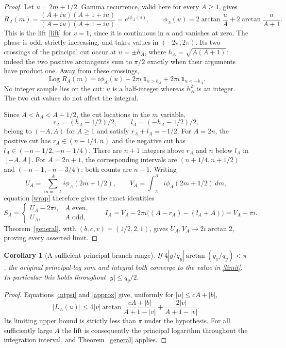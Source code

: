 \documentclass[10pt]{article}
\newtheorem{corollary}{Corollary}
\DeclareMathOperator{\Log}{Log}
\begin{document}
\begin{proof}
Let $u=2m+1/2$. Gamma recurrence, valid here for every $A\ge1$, gives
\begin{equation}\label{rational}
 R_A(m)=\frac{(A+iu)(A+1+iu)}{(A-iu)(A+1-iu)}
       =e^{i\phi_A(u)},\qquad
 \phi_A(u)=2\arctan\frac uA+2\arctan\frac u{A+1}.
\end{equation}
This is the lift \eqref{lift} for $v=1$, since it is continuous in
$u$ and vanishes at zero. The phase is odd, strictly increasing,
and takes values in $(-2\pi,2\pi)$. Its two crossings of the
principal cut occur at $u=\pm h_A$, where
$h_A=\sqrt{A(A+1)}$: indeed the two positive arctangents sum to
$\pi/2$ exactly when their arguments have product one.
Away from these crossings,
\begin{equation}\label{wrap}
 \Log R_A(m)=i\phi_A(u)-2\pi i\,\mathbf1_{u>h_A}
                               +2\pi i\,\mathbf1_{u<-h_A}.
\end{equation}
No integer sample lies on the cut: $u$ is a half-integer whereas
$h_A^2$ is an integer. The two cut values do not affect the integral.

Since $A<h_A<A+1/2$, the cut locations in the $m$ variable,
\[
 r_A=(h_A-1/2)/2,\qquad l_A=(-h_A-1/2)/2,
\]
belong to $(-A,A)$ for $A\ge1$ and satisfy $r_A+l_A=-1/2$.
For $A=2n$, the positive cut has $r_A\in(n-1/4,n)$ and the negative
cut has $l_A\in(-n-1/2,-n-1/4)$. There are $n+1$ integers above
$r_A$ and $n$ below $l_A$ in $[-A,A]$.
For $A=2n+1$, the corresponding intervals are
$(n+1/4,n+1/2)$ and $(-n-1,-n-3/4)$; both counts are $n+1$.
Writing
\[
 U_A=\sum_{m=-A}^{A}i\phi_A(2m+1/2),\qquad
 V_A=\int_{-A}^{A}i\phi_A(2m+1/2)\,dm,
\]
equation \eqref{wrap} therefore gives the exact identities
\[
 S_A=\begin{cases}U_A-2\pi i,&A\text{ even},\\U_A,&A\text{ odd},\end{cases}
 \qquad
 I_A=V_A-2\pi i\big((A-r_A)-(l_A+A)\big)=V_A-\pi i.
\]
Theorem~\ref{general}, with $(b,c,v)=(1/2,2,1)$, gives
$U_A,V_A\to2i\arctan2$, proving every asserted limit.
\end{proof}

\begin{corollary}[A sufficient principal-branch range]
If $4|y/q_y|\arctan(q_x/q_y)<\pi$, the original principal-log
sum and integral both converge to the value in \eqref{limit}.
In particular this holds throughout $|y|\le q_y/2$.
\end{corollary}
\begin{proof}
Equations \eqref{intpsi} and \eqref{approx} give, uniformly for
$|u|\le cA+|b|$,
\[
 |L_A(u)|\le4|v|\arctan\frac{cA+|b|}{A+1-|v|}
             +\frac{2|v|}{A+1-|v|}.
\]
Its limiting upper bound is strictly less than $\pi$ under the
hypothesis. For all sufficiently large $A$ the lift is consequently
the principal logarithm throughout the integration interval, and
Theorem~\ref{general} applies.
\end{proof}
\end{document}
